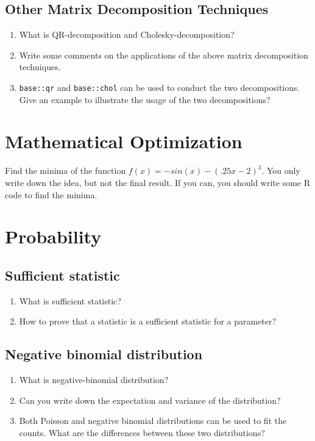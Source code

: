 \documentclass[11pt,a4paper]{article}
\begin{document}
\begin{CJK*}{UTF8}{gbsn}
\subsection{Other Matrix Decomposition Techniques}
\begin{enumerate}[(1)]
    \item What is QR-decomposition and Cholesky-decomposition?
    \item Write some comments on the applications of the above 
        matrix decomposition techniques.
    \item \texttt{base::qr} and \texttt{base::chol} can be used 
        to conduct the two decompositions. Give an example to 
        illustrate the usage of the two decompositions?
\end{enumerate}

\section{Mathematical Optimization}
Find the minima of the function $f(x) = -sin(x) - (.25x - 2)^3$.
You only write down the idea, but not the final result. If you 
can, you should write some R code to find the minima.


\section{Probability}

\subsection{Sufficient statistic}
\begin{enumerate}[(1)]
    \item What is sufficient statistic?
    \item How to prove that a statistic is a sufficient statistic for a 
        parameter?
\end{enumerate}

\subsection{Negative binomial distribution}
\begin{enumerate}[(1)]
    \item What is negative-binomial distribution?
    \item Can you write down the expectation and variance of the distribution?
    \item Both Poisson and negative binomial distributions can be used to fit 
        the counts. What are the differences between these two distributions?
\end{enumerate}


\end{CJK*}
\end{document}
